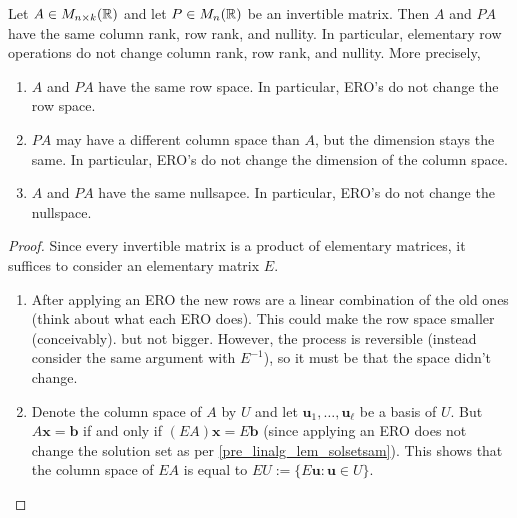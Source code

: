 \documentclass[10pt, a4paper]{article}
\newcommand{\mbf}[1]{\mathbf{#1}}
\begin{document}
\begin{proposition}\label{pre_linalg_prop_invmatrsameranksandnul}
    Let $A \in M_{n \times k}(\mathbb{R})$ and let $P \in M_{n}(\mathbb{R})$ be an invertible matrix.
    Then $A$ and $PA$ have the same column rank,
    row rank,
    and nullity.
    In particular,
    elementary row operations do not change column rank,
    row rank,
    and nullity.
    More precisely,
    \begin{enumerate}
        \item $A$ and $PA$ have the same row space.
        In particular,
        ERO's do not change the row space.
        \item $PA$ may have a different column space than $A$,
        but the dimension stays the same.
        In particular,
        ERO's do not change the dimension of the column space.
        \item $A$ and $PA$ have the same nullsapce.
        In particular,
        ERO's do not change the nullspace.
    \end{enumerate}

    \begin{proof}
        Since every invertible matrix is a product of elementary matrices,
        it suffices to consider an elementary matrix $E$.
        \begin{enumerate}[label = (\roman*)]
            \item After applying an ERO the new rows are a linear combination of the old ones
            (think about what each ERO does).
            This could make the row space smaller
            (conceivably).
            but not bigger.
            However,
            the process is reversible
            (instead consider the same argument with $E ^ {-1}$),
            so it must be that the space didn't change.
            \item Denote the column space of $A$ by $U$ and let $\mbf{u}_1, \dotsc, \mbf{u}_{\ell}$ be a basis of $U$.
            But $A\mbf{x} = \mbf{b}$ if and only if $(EA)\mbf{x} = E\mbf{b}$
            (since applying an ERO does not change the solution set as per \autoref{pre_linalg_lem_solsetsam}).
            This shows that the column space of $EA$ is equal to $EU := \{E\mbf{u} : \mbf{u} \in U\}$.


\end{enumerate}
\end{proof}
\end{proposition}
\end{document}
